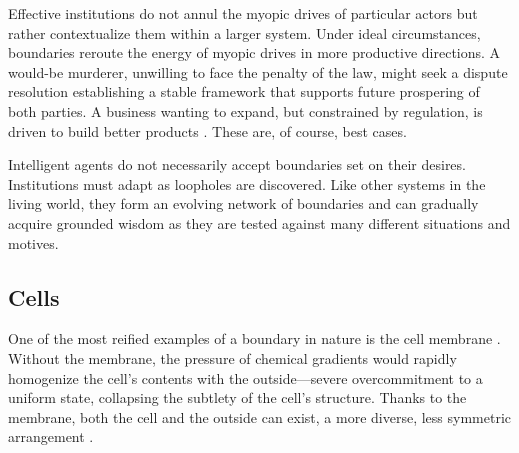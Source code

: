 \documentclass[12pt]{article}
\begin{document}
Effective institutions do not annul the myopic drives of particular actors but rather contextualize them within a larger system. Under ideal circumstances, boundaries reroute the energy of myopic drives in more productive directions. A would-be murderer, unwilling to face the penalty of the law, might seek a dispute resolution establishing a stable framework that supports future prospering of both parties. A business wanting to expand, but constrained by regulation, is driven to build better products \citep{wu2011master, ashford1985using, ambec2013porter}. These are, of course, best cases.

Intelligent agents do not necessarily accept boundaries set on their desires. Institutions must adapt as loopholes are discovered. Like other systems in the living world, they form an evolving network of boundaries \citep{campbell1979assessing, ordonez2009goals, kerr1975folly, burns2006impact} and can gradually acquire grounded wisdom as they are tested against many different situations and motives.


\subsection{Cells}




One of the most reified examples of a boundary in nature is the cell membrane \citep{watson2015biological, alberts2022molecular, bray2019wetware, harold2001way, lane2015vital}. Without the membrane, the pressure of chemical gradients would rapidly homogenize the cell's contents with the outside---severe overcommitment to a uniform state, collapsing the subtlety of the cell's structure. Thanks to the membrane, both the cell and the outside can exist, a more diverse, less symmetric arrangement \citep{schrodinger1944what, anderson1972more, prigogine1984order, turing1952chemical}. 
\end{document}

